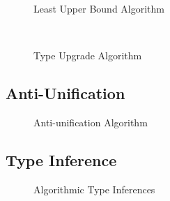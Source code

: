 \begin{figure}[h]
  \ottdefnLUBNsub{}
  \caption{Least Upper Bound Algorithm}
  \label{fig:lub}
\end{figure}

\begin{figure}[h]
    \hfill\\
    \ottdefnLUBUp{}
    \caption{Type Upgrade Algorithm}
    \label{fig:type-upgrade}
\end{figure}

\subsection{Anti-Unification}

\begin{figure}[h]
    \ottdefnAUAUP{}
    \ottdefnAUAUN{}

    \caption{Anti-unification Algorithm}
    \label{fig:anti-unification}
\end{figure}

\subsection{Type Inference}


\begin{figure}
    \centering
    \begin{subfigure}[b]{0.3\textwidth}
        \centering
        \ottdefnATNInf{}
    \end{subfigure}

    \begin{subfigure}[b]{0.3\textwidth}
        \centering
        \ottdefnATPInf{}
    \end{subfigure}

    \begin{subfigure}[b]{0.3\textwidth}
        \centering
        \ottdefnATSpinInf{}
    \end{subfigure}
    \caption{Algorithmic Type Inferences}
    \label{fig:type-inference}
\end{figure}

